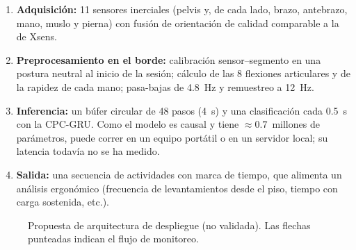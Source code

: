 \documentclass[letterpaper,11pt]{article}
\begin{document}
\begin{enumerate}
  \item \textbf{Adquisición:} 11 sensores inerciales (pelvis y, de cada lado, brazo, antebrazo, mano, muslo y pierna) con fusión de orientación de calidad comparable a la de Xsens.
  \item \textbf{Preprocesamiento en el borde:} calibración sensor--segmento en una postura neutral al inicio de la sesión; cálculo de las 8 flexiones articulares y de la rapidez de cada mano; pasa-bajas de 4.8~Hz y remuestreo a 12~Hz.
  \item \textbf{Inferencia:} un búfer circular de 48 pasos (4~s) y una clasificación cada 0.5~s con la CPC-GRU. Como el modelo es causal y tiene $\approx 0.7$~millones de parámetros, puede correr en un equipo portátil o en un servidor local; su latencia todavía no se ha medido.
  \item \textbf{Salida:} una secuencia de actividades con marca de tiempo, que alimenta un análisis ergonómico (frecuencia de levantamientos desde el piso, tiempo con carga sostenida, etc.).
\end{enumerate}

\begin{figure}[H]
\centering
{}
\caption{Propuesta de arquitectura de despliegue (no validada). Las flechas punteadas indican el flujo de monitoreo.}
\label{fig:despliegue}
\end{figure}
\end{document}
